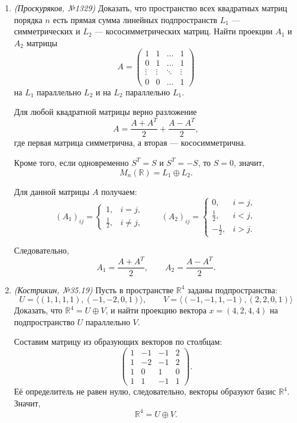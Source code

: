 \begin{enumerate}
Для единичного вектора $e_i$ имеем $x_1+\dots+x_n=1$, поэтому
\[
\operatorname{pr}_{L_2}^{L_1}e_i=\frac1n(1,1,\dots,1),
\]
\[
\operatorname{pr}_{L_1}^{L_2}e_i=e_i-\frac1n(1,1,\dots,1).
\]

То есть
\[
\operatorname{pr}_{L_1}^{L_2}e_i
=\left(-\frac1n,\dots,-\frac1n,\frac{n-1}{n},-\frac1n,\dots,-\frac1n\right),
\]
где на $i$-м месте стоит число $\frac{n-1}{n}$.

\item \textit{(Проскуряков, №1329)} Доказать, что пространство всех квадратных матриц порядка $n$ есть прямая сумма линейных подпространств $L_1$ — симметрических и $L_2$ — кососимметрических матриц. Найти проекции $A_1$ и $A_2$ матрицы
\[
A = \begin{pmatrix}
1 & 1 & \dots & 1 \\
0 & 1 & \dots & 1 \\
\vdots & \vdots & \ddots & \vdots \\
0 & 0 & \dots & 1
\end{pmatrix}
\]
на $L_1$ параллельно $L_2$ и на $L_2$ параллельно $L_1$.

Для любой квадратной матрицы верно разложение
\[
A=\frac{A+A^T}{2}+\frac{A-A^T}{2},
\]
где первая матрица симметрична, а вторая — кососимметрична.

Кроме того, если одновременно $S^T=S$ и $S^T=-S$, то $S=0$, значит,
\[
M_n(\mathbb R)=L_1\oplus L_2.
\]

Для данной матрицы $A$ получаем:
\[
(A_1)_{ij}=\begin{cases}
1, & i=j,\\
\frac12, & i\ne j,
\end{cases}
\qquad
(A_2)_{ij}=\begin{cases}
0, & i=j,\\
\frac12, & i<j,\\
-\frac12, & i>j.
\end{cases}
\]

Следовательно,
\[
A_1=\frac{A+A^T}{2},
\qquad
A_2=\frac{A-A^T}{2}.
\]

\item \textit{(Кострикин, №35.19)} Пусть в пространстве $\mathbb{R}^4$ заданы подпространства:
\[
U = \langle (1, 1, 1, 1), (-1, -2, 0, 1) \rangle, \qquad V = \langle (-1, -1, 1, -1), (2, 2, 0, 1) \rangle
\]
Доказать, что $\mathbb{R}^4 = U \oplus V$, и найти проекцию вектора $x = (4, 2, 4, 4)$ на подпространство $U$ параллельно $V$.

Составим матрицу из образующих векторов по столбцам:
\[
\begin{pmatrix}
    1 & -1 & -1 & 2 \\
    1 & -2 & -1 & 2 \\
    1 & 0 & 1 & 0 \\
    1 & 1 & -1 & 1
\end{pmatrix}.
\]
Её определитель не равен нулю, следовательно, векторы образуют базис $\mathbb R^4$.
Значит,
\[
\mathbb R^4=U\oplus V.
\]


\end{enumerate}
